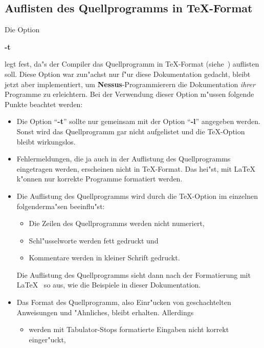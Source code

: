 \subsection{Auflisten des Quellprogramms in \TeX-Format}

Die Option 

\centerline{{\bf -t}}

legt fest, da"s der Compiler das Quellprogramm in
\TeX-Format
(siehe~\cite{knu84,lam86}) auflisten soll.  	Diese Option war
zun"achst nur f"ur diese Dokumentation gedacht, bleibt jetzt aber
implementiert, um {\bf Nessus}-Programmierern die Dokumentation {\it
ihrer\/} Programme zu 	erleichtern. Bei der Verwendung dieser Option
m"ussen folgende Punkte beachtet werden:

\begin{itemize}
	  \item Die Option ``{\bf -t}'' sollte nur gemeinsam mit der Option ``{\bf -l}'' angegeben
		werden. Sonst wird das Quellprogramm gar nicht aufgelistet und die \TeX-Option
		bleibt wirkungslos.
	  \item Fehlermeldungen, die ja auch in der Auflistung des Quellprogramms eingetragen
		werden, erscheinen nicht in \TeX-Format. Das hei"st,  mit \LaTeX~ k"onnen nur
		korrekte Programme formatiert werden. 
	  \item Die Auflistung des Quellprogramms wird durch  die \TeX-Option im einzelnen
		folgenderma"sen beeinflu"st:
		\begin{itemize}
		  \item Die Zeilen des Quellprogramms werden nicht numeriert,
		  \item Schl"usselworte werden fett gedruckt und
		  \item Kommentare werden in kleiner Schrift gedruckt.
		\end{itemize}
		Die Auflistung des Quellprogramms sieht dann nach der Formatierung mit \LaTeX~ so
		aus, wie die Beispiele in dieser Dokumentation. 
	  \item Das Format des Quellprogramm, also Einr"ucken von geschachtelten Anweisungen und
		"Ahnliches, bleibt erhalten. Allerdings 
		\begin{itemize}
		  \item werden mit Tabulator-Stops formatierte Eingaben nicht korrekt einger"uckt,

\end{itemize}
\end{itemize}
